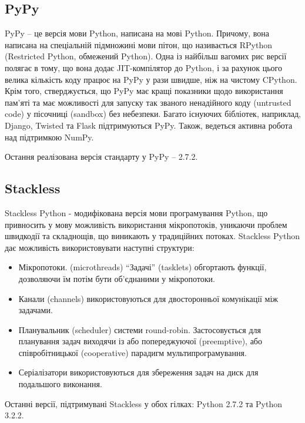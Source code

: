 \documentclass[a4paper, 12pt, onsedie]{article}
\begin{document}
\subsection{PyPy}
    PyPy -- це версія мови Python, написана на мові Python. Причому, вона написана на спеціальній 
    підмножині мови пітон, що називається RPython (Restricted Python, обмежений Python). Одна 
    із найбільш вагомих рис версії полягає в тому, що вона додає JIT-компілятор до Python, і за 
    рахунок цього велика кількість коду працює на PyPy у рази швидше, ніж на чистому CPython. 
    Крім того, стверджується, що PyPy має кращі показники щодо використання пам'яті та має 
    можливості для запуску так званого ненадійного коду (untrusted code) у пісочниці (sandbox) 
    без небезпеки. Багато існуючих бібліотек, наприклад, Django, Twisted та Flask підтримуються 
    PyPy. Також, ведеться активна робота над підтримкою NumPy.

    Остання реалізована версія стандарту у PyPy -- 2.7.2.

\subsection{Stackless}
    Stackless Python - модифікована версія мови програмування Python, що привносить у мову
    можливість використання мікропотоків, уникаючи проблем швидкодії та складнощів, що виникають
    у традиційних потоках. Stackless Python дає можливість використовувати наступні структури:
    \begin{itemize}
        \item Мікропотоки. (microthreads) ``Задачі'' (tasklets) обгортають функції, дозволяючи їм 
              потім бути об'єднаними у мікропотоки.
        \item Канали (channels) використовуються для двосторонньої комунікації між задачами.
        \item Планувальник (scheduler) системи round-robin. Застосовується для планування
              задач виходячи із або попереджуючої (preemptive), або співробітницької (cooperative) 
              парадигм мультипрограмування.
        \item Серіалізатори використовуються для збереження задач на диск для подальшого виконання.
    \end{itemize}

    Останні версії, підтримувані Stackless у обох гілках: Python 2.7.2 та Python 3.2.2.
\end{document}

